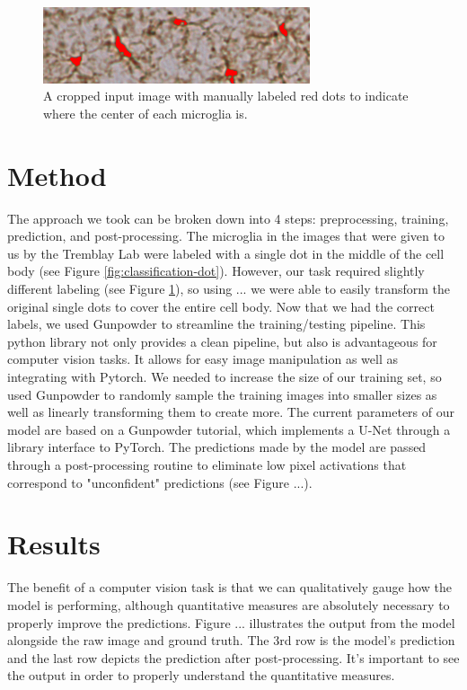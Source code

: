 \documentclass{article}
\begin{document}
\begin{figure}
  \includegraphics[width=0.7\textwidth]{classification-cell.png}
  \centering
  \caption{A cropped input image with manually labeled red dots to indicate where 
  the center of each microglia is.}
  \label{fig:classification-cell}
\end{figure}


\section{Method}

The approach we took can be broken down into 4 steps: preprocessing, training,
prediction, and post-processing. The microglia in the images that were given to
us by the Tremblay Lab were labeled with a single dot in the middle of the cell
body (see Figure \ref{fig:classification-dot}). However, our task 
required slightly different labeling (see Figure \ref{fig:classification-cell}),
so using ... we were able to easily transform the original single dots to 
cover the entire cell body. Now that we had the correct labels, we used 
Gunpowder to streamline the training/testing pipeline. This python library 
not only provides a clean pipeline, but also is advantageous for computer 
vision tasks. It allows for easy image manipulation as well as integrating 
with Pytorch. We needed to increase the size of our training set, so used 
Gunpowder to randomly sample the training images into smaller sizes as well 
as linearly transforming them to create more. The current parameters of our 
model are based on a Gunpowder tutorial, which implements a U-Net through a 
library interface to PyTorch. The predictions made by the model are passed 
through a post-processing routine to eliminate low pixel activations that 
correspond to "unconfident" predictions (see Figure ...).

\section{Results}

The benefit of a computer vision task is that we can qualitatively gauge how 
the model is performing, although quantitative measures are absolutely 
necessary to properly improve the predictions. Figure ... illustrates the 
output from the model alongside the raw image and ground truth. The 3rd row 
is the model’s prediction and the last row depicts the prediction after
post-processing. It’s important to see the output in order to properly understand 
the quantitative measures.
\end{document}
